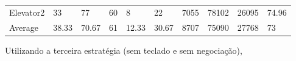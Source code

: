﻿\documentclass[a4paper]{article}
\begin{document}
\begin{table}[h]
\begin{tabular}{@{}llllllllll@{}}
Elevator2 & 33       & 77            & 60           & 8                                                               & 22                                                                  & 7055                                                         & 78102                                                 & 26095                                                   & 74.96         \\
Average   & 38.33     & 70.67         & 61        & 12.33                                                            & 30.67                                                               & 8707                                                         & 75090                                                 & 27768                                                   &  73         \\ \bottomrule
\end{tabular}
\end{table}

Utilizando a terceira estratégia (sem teclado e sem negociação),
\end{document}
